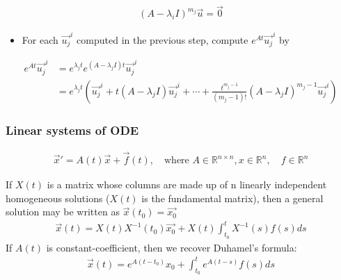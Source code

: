 \documentclass[12pt]{article}
\begin{document}
\begin{align*}
	(A-\lambda_i I)^{m_j} \vec{u} = \vec{0}
\end{align*}

\begin{itemize}
\item For each \(\vec{u_j}^i\) computed in the previous step, compute \(e^{At}\vec{u_j}^i\) by
\end{itemize}

\begin{align*}
	e^{At}\vec{u_j}^i & =e^{\lambda_jt}e^{(A-\lambda_jI)t}\vec{u_j}^i                                                                              \\
	                  & =e^{\lambda_jt}(\vec{u_j}^i+t(A-\lambda_jI)\vec{u_j}^i+\cdots+\frac{t^{m_j-1}}{(m_j-1)!}(A-\lambda_jI)^{m_j-1}\vec{u_j}^i)
\end{align*}
\subsubsection*{Linear systems of ODE}
\label{sec:orgf8fe1d3}
\begin{align*}
	\vec{x}' = A(t)\vec{x} + \vec{f}(t), \quad \text{where } A\in\mathbb{R}^{n\times n},
	x\in\mathbb{R}^n, \quad f\in\mathbb{R}^n
\end{align*}

If \(X(t)\) is a matrix whose columns are made up of n linearly independent
homogeneous solutions (\(X(t)\) is the fundamental matrix), then a general
solution may be written as \(\vec{x}(t_0)=\vec{x_0}\)
\begin{align*}
	\vec{x}(t) = X(t)X^{-1}(t_0)\vec{x_0}+X(t)\int_{t_0}^{t}X^{-1}(s)f(s)ds
\end{align*}
If \(A(t)\) is constant-coefficient, then we recover Duhamel's formula:
\begin{align*}
	\vec{x}(t) = e^{A(t-t_0)}x_0 + \int_{t_0}^{t}e^{A(t-s)}f(s)ds
\end{align*}
\end{document}
